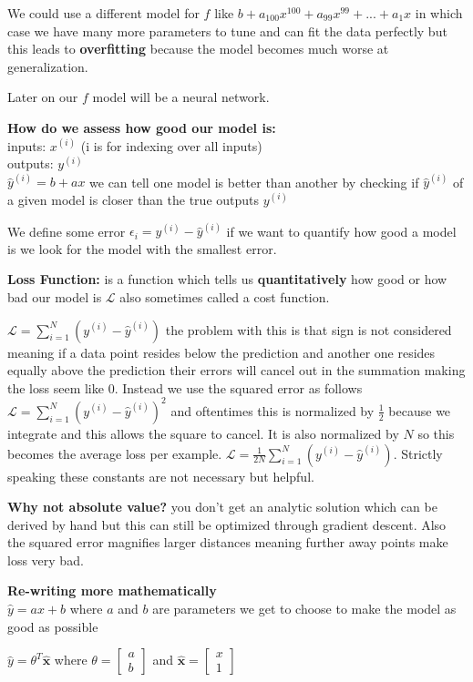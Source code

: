 \documentclass[twocolumn, letter, 10pt, landscape]{article}
\begin{document}
We could use a different model for $f$ like $b+a_{100}x^{100} + a_{99}x^{99}+...+a_1x$ in which case we have many more parameters to tune and can fit the data perfectly but this leads to \textbf{overfitting} because the model becomes much worse at generalization.

Later on our $f$ model will be a neural network.

\textbf{How do we assess how good our model is:}\\
inputs: $x^{(i)}$ (i is for indexing over all inputs)\\
outputs: $y^{(i)}$\\
$\hat{y}^{(i)}=b+ax$ we can tell one model is better than another by checking if $\hat{y}^{(i)}$ of a given model is closer than the true outputs $y^{(i)}$

We define some error $\epsilon_i = y^{(i)}-\hat{y}^{(i)}$ if we want to quantify how good a model is we look for the model with the smallest error.

\textbf{Loss Function:} is a function which tells us \textbf{quantitatively} how good or how bad our model is $\mathcal{L}$ also sometimes called a cost function.

$\mathcal{L} = \sum_{i=1}^{N} (y^{(i)}-\hat{y}^{(i)})$ the problem with this is that sign is not considered meaning if a data point resides below the prediction and another one resides equally above the prediction their errors will cancel out in the summation making the loss seem like $0$. Instead we use the squared error as follows $\mathcal{L} = \sum_{i=1}^{N} (y^{(i)}-\hat{y}^{(i)})^2$ and oftentimes this is normalized by $\frac{1}{2}$ because we integrate and this allows the square to cancel. It is also normalized by $N$ so this becomes the average loss per example. $\mathcal{L} = \frac{1}{2N}\sum_{i=1}^{N} (y^{(i)}-\hat{y}^{(i)})$. Strictly speaking these constants are not necessary but helpful.

\textbf{Why not absolute value?} you don't get an analytic solution which can be derived by hand but this can still be optimized through gradient descent. Also the squared error magnifies larger distances meaning further away points make loss very bad.

\textbf{Re-writing more mathematically}\\
$\hat{y}=ax+b$ where $a$ and $b$ are parameters we get to choose to make the model as good as possible

$\hat{y} = \theta^T\hat{\mathbf{x}}$ where $\theta = \begin{bmatrix} a\\b\end{bmatrix}$ and $\hat{\mathbf{x}} = \begin{bmatrix} x \\ 1 \end{bmatrix}$
\end{document}
